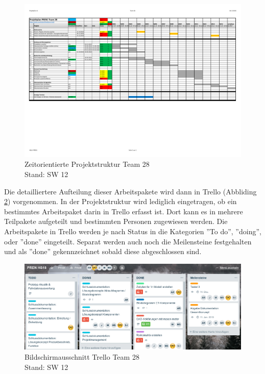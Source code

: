 \documentclass[../../main.tex]{subfiles}
\begin{document}
\begin{figure}[H] \centering
    \includegraphics[page=1,width=1\textwidth, trim=.6cm 7cm .6cm 1.5cm, clip]{Projektplanung.pdf}
    \caption{Zeitorientierte Projektstruktur Team 28\\Stand: SW 12}
    \label{fig:projektplanung}
\end{figure}

Die detailliertere Aufteilung dieser Arbeitspakete wird dann in Trello (Abbliding \ref{fig:screenTrello}) vorgenommen. In der Projektstruktur wird lediglich eingetragen, ob ein bestimmtes Arbeitspaket darin in Trello erfasst ist. Dort kann es in mehrere Teilpakete aufgeteilt und bestimmten Personen zugewiesen werden. Die Arbeitspakete in Trello werden je nach Status in die Kategorien ''To do'', ''doing'', oder ''done'' eingeteilt. Separat werden auch noch die Meilensteine festgehalten und als ''done'' gekennzeichnet sobald diese abgeschlossen sind.\\

\begin{figure}[H] \centering
    \includegraphics[page=1,width=.8\textwidth]{screenTrello.png}
    \caption{Bildschirmausschnitt Trello Team 28\\Stand: SW 12}
    \label{fig:screenTrello}
\end{figure}
\pagebreak
\end{document}
